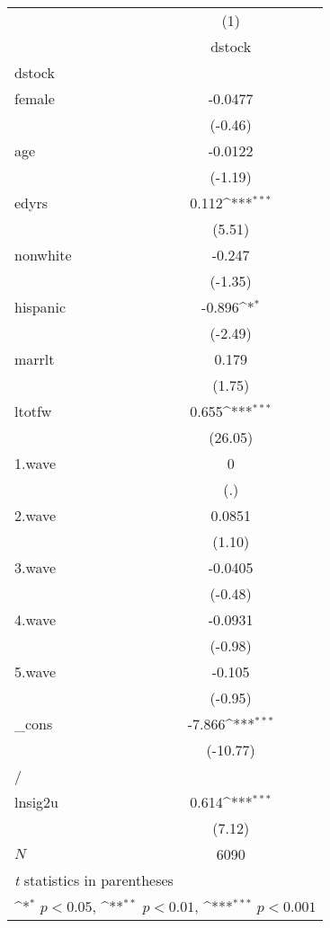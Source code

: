{
\def\sym#1{\ifmmode^{#1}\else\(^{#1}\)\fi}
\begin{tabular}{l*{1}{c}}
\hline\hline
            &\multicolumn{1}{c}{(1)}\\
            &\multicolumn{1}{c}{dstock}\\
\hline
dstock      &                     \\
female      &     -0.0477         \\
            &     (-0.46)         \\
[1em]
age         &     -0.0122         \\
            &     (-1.19)         \\
[1em]
edyrs       &       0.112\sym{***}\\
            &      (5.51)         \\
[1em]
nonwhite    &      -0.247         \\
            &     (-1.35)         \\
[1em]
hispanic    &      -0.896\sym{*}  \\
            &     (-2.49)         \\
[1em]
marrlt      &       0.179         \\
            &      (1.75)         \\
[1em]
ltotfw      &       0.655\sym{***}\\
            &     (26.05)         \\
[1em]
1.wave      &           0         \\
            &         (.)         \\
[1em]
2.wave      &      0.0851         \\
            &      (1.10)         \\
[1em]
3.wave      &     -0.0405         \\
            &     (-0.48)         \\
[1em]
4.wave      &     -0.0931         \\
            &     (-0.98)         \\
[1em]
5.wave      &      -0.105         \\
            &     (-0.95)         \\
[1em]
\_cons      &      -7.866\sym{***}\\
            &    (-10.77)         \\
\hline
/           &                     \\
lnsig2u     &       0.614\sym{***}\\
            &      (7.12)         \\
\hline
\(N\)       &        6090         \\
\hline\hline
\multicolumn{2}{l}{\footnotesize \textit{t} statistics in parentheses}\\
\multicolumn{2}{l}{\footnotesize \sym{*} \(p<0.05\), \sym{**} \(p<0.01\), \sym{***} \(p<0.001\)}\\
\end{tabular}
}
